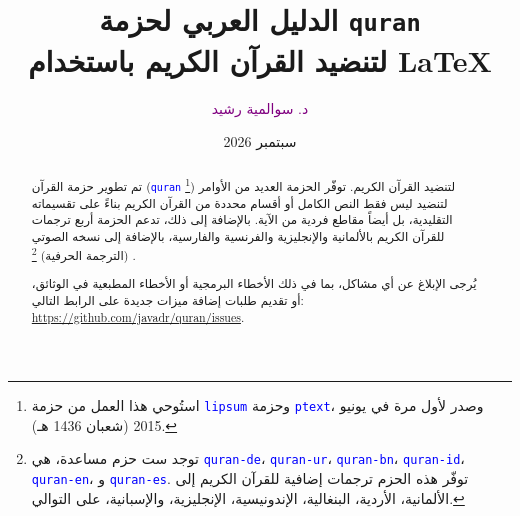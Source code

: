 \documentclass[12pt,a4paper]{article}
\begin{document}
\linespread{1.2}
\title{%
  \quranlogo[scale=0.5]\\[1.5cm]
  {\color{red}\Huge
    الدليل العربي لحزمة
    \textenglish{\texttt{quran}}\footnotemark
    \\
  }
  \vspace{1.5cm}
  {\color{blue}\large
    لتنضيد القرآن الكريم باستخدام \LaTeX
    \\
  }
}

\author{%
  \textcolor{purple}{د. سوالمية رشيد}\footnotemark
}

\date{%
  \textcolor{green!50!black}{\Huge سبتمبر 2026}
}

\maketitle

\addtocounter{footnote}{-1}

\addtocounter{footnote}{1}

\newpage
\maketitle

\newpage 

\begin{abstract}
تم تطوير حزمة القرآن
 (\textcolor{blue}{\textenglish{\texttt{quran}}} 
 \footnote{
استُوحي هذا العمل من حزمة
\textcolor{blue}{\textenglish{\texttt{lipsum}}}
  وحزمة 
\textcolor{blue}{\textenglish{\texttt{ptext}}}، وصدر لأول مرة في يونيو 2015 (شعبان 1436 هـ).})
لتنضيد القرآن الكريم. توفّر الحزمة العديد من الأوامر لتنضيد ليس فقط النص الكامل أو أقسام محددة من القرآن الكريم بناءً على تقسيماته التقليدية، بل أيضاً مقاطع فردية من الآية. بالإضافة إلى ذلك، تدعم الحزمة أربع ترجمات للقرآن الكريم بالألمانية والإنجليزية والفرنسية والفارسية، بالإضافة إلى نسخه الصوتي (الترجمة الحرفية)
 \footnote{توجد ست حزم مساعدة، هي
\textcolor{blue}{\textenglish{\texttt{quran-de}}}،
\textcolor{blue}{\textenglish{\texttt{quran-ur}}}، 
\textcolor{blue}{\textenglish{\texttt{quran-bn}}}، 
\textcolor{blue}{\textenglish{\texttt{quran-id}}}، 
\textcolor{blue}{\textenglish{\texttt{quran-en}}}، و 
\textcolor{blue}{\textenglish{\texttt{quran-es}}}.
توفّر هذه الحزم ترجمات إضافية للقرآن الكريم إلى الألمانية،
الأردية، البنغالية، الإندونيسية، الإنجليزية، والإسبانية، على التوالي.}
 .
 
يُرجى الإبلاغ عن أي مشاكل، بما في ذلك الأخطاء البرمجية أو الأخطاء المطبعية في الوثائق، أو تقديم طلبات إضافة ميزات جديدة على الرابط التالي:
\url{https://github.com/javadr/quran/issues}. 
\end{abstract}
\end{document}

